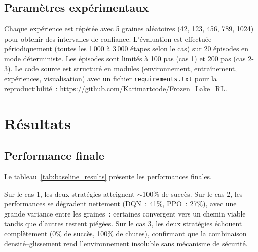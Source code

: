 \documentclass{article}
\begin{document}
\subsection{Paramètres expérimentaux}

Chaque expérience est répétée avec 5 graines aléatoires (42, 123, 456, 789, 1024) pour obtenir des intervalles de confiance. L'évaluation est effectuée périodiquement (toutes les 1\,000 à 3\,000 étapes selon le cas) sur 20 épisodes en mode déterministe. Les épisodes sont limités à 100 pas (cas 1) et 200 pas (cas 2-3). Le code source est structuré en modules (environnement, entraînement, expériences, visualisation) avec un fichier \texttt{requirements.txt} pour la reproductibilité~: \url{https://github.com/Karimartcode/Frozen_Lake_RL}.

\section{Résultats}

\subsection{Performance finale}

Le tableau~\ref{tab:baseline_results} présente les performances finales.



Sur le cas 1, les deux stratégies atteignent $\sim$100\% de succès. Sur le cas 2, les performances se dégradent nettement (DQN~: 41\%, PPO~: 27\%), avec une grande variance entre les graines~: certaines convergent vers un chemin viable tandis que d'autres restent piégées. Sur le cas 3, les deux stratégies échouent complètement (0\% de succès, 100\% de chutes), confirmant que la combinaison densité--glissement rend l'environnement insoluble sans mécanisme de sécurité.
\end{document}
